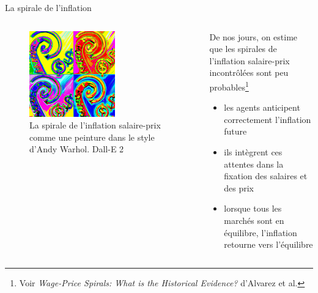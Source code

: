 \documentclass[
  ignorenonframetext,
  aspectratio=169,
]{beamer}
\providecommand{\tightlist}{%
  \setlength{\itemsep}{0pt}\setlength{\parskip}{0pt}}\usepackage{longtable,booktabs,array}
\begin{document}
\begin{frame}{La spirale de l'inflation}
\label{la-spirale-de-linflation-2}
\begin{columns}[T]
\begin{column}{0.48\textwidth}
\begin{figure}[H]

{\centering \includegraphics[width=0.6\textwidth,height=\textheight]{assets/warhol_spiral.png}

}

\caption{La spirale de l'inflation salaire-prix comme une peinture dans
le style d'Andy Warhol. Dall-E 2}

\end{figure}%
\end{column}

\begin{column}{0.48\textwidth}
De nos jours, on estime que les spirales de l'inflation salaire-prix
incontrôlées sont peu
probables\footnote{Voir \emph{Wage-Price Spirals: What is the Historical Evidence?} d'Alvarez et al.}

\begin{itemize}
\tightlist
\item
  les agents anticipent correctement l'inflation future
\item
  ils intègrent ces attentes dans la fixation des salaires et des prix
\item
  lorsque tous les marchés sont en équilibre, l'inflation retourne vers
  l'équilibre
\end{itemize}
\end{column}
\end{columns}
\end{frame}
\end{document}

